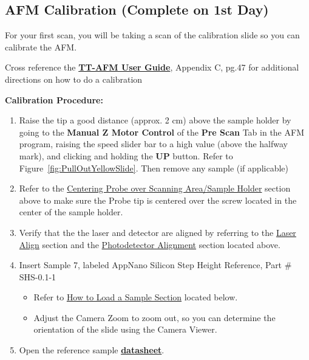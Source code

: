 \documentclass{../lab}
\begin{document}
\subsection{AFM Calibration (Complete on 1st Day)}

For your first scan, you will be taking a scan of the calibration slide so you can calibrate the AFM.

Cross reference the \href{http://experimentationlab.berkeley.edu/tt-afmuserguidev2.2}{\textbf{TT-AFM User Guide}}, Appendix C, pg.47 for additional directions on how to do a calibration

\textbf{Calibration Procedure:}

\begin{enumerate}
    \item Raise the tip a good distance (approx. 2 cm) above the sample holder by going to the \textbf{Manual Z Motor Control} of the \textbf{Pre Scan} Tab in the AFM program, raising the speed slider bar to a high value (above the halfway mark), and clicking and holding the \textbf{UP }button.  Refer to Figure~\ref{fig:PullOutYellowSlide}.  Then remove any sample (if applicable)

    \item Refer to the \hyperref[sec:Alignment]{Centering Probe over Scanning Area/Sample Holder} section above to make sure the Probe tip is centered over the screw located in the center of the sample holder.

    \item Verify that the the laser and detector are aligned by referring to the \hyperref[subsec:LaserAlign]{Laser Align} section and the \hyperref[subsec:PhotodetectorAlignment]{Photodetector Alignment} section located above.

    \item Insert Sample 7, labeled AppNano Silicon Step Height Reference, Part \# SHS-0.1-1

    \begin{itemize}
        \item Refer to \hyperref[subsec:HowToLoadASample]{How to Load a Sample Section} located below.

        \item Adjust the Camera Zoom to zoom out, so you can determine the orientation of the slide using the Camera Viewer.
    \end{itemize}

    \item Open the reference sample \href{http://experimentationlab.berkeley.edu/sites/default/files/AFMImages/Reference-\%20sample-SHS-01\_3\_datasheet.pdf}{\textbf{datasheet}}.


\end{enumerate}
\end{document}
